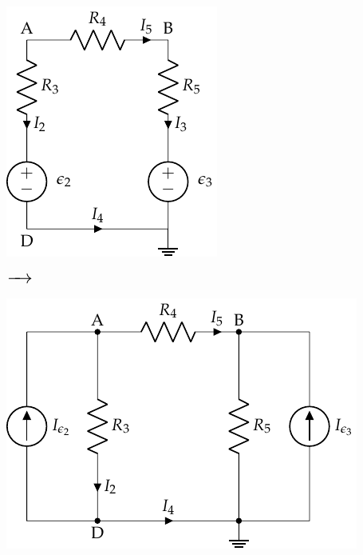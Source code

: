 \vspace{2mm}
\begin{minipage}{0.32\linewidth}
    \begin{center}
        \includegraphics[scale=1]{figuras/nudos_condensadores3.pdf}
    \end{center}
\end{minipage}
\begin{minipage}[c]{0.08\linewidth}
    \begin{center}
    $\LARGE \xrightarrow{\hspace*{0.5cm}}$ %
    \end{center}
\end{minipage}    
\begin{minipage}{0.6\linewidth}
    \begin{center}
        \includegraphics[scale=1]{figuras/nudos_condensadores4.pdf}
    \end{center}
\end{minipage}

